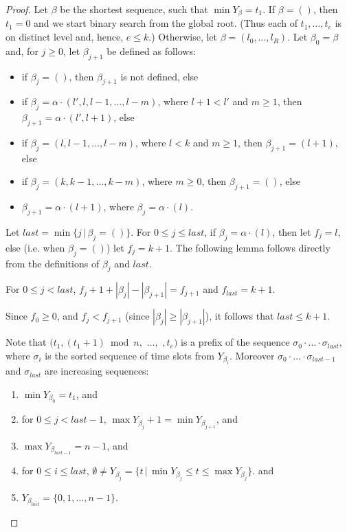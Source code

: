 \documentclass{llncs}
\begin{document}
\begin{proof}
Let $\beta$ be the shortest sequence, such that $\min Y_\beta= t_1$.
If $\beta=()$, then $t_1=0$ and we start binary search from the global root.
(Thus each of $t_1, \ldots, t_{e}$ is on distinct level and, hence, $e\le k$.)
Otherwise, let $\beta=(l_0,\ldots,l_R)$.
Let $\beta_0=\beta$ and, for $j\ge 0$, let $\beta_{j+1}$ be defined
as follows:
\begin{itemize}
\item 
  if $\beta_j=()$, then $\beta_{j+1}$ is not defined, 
  else
\item 
  if $\beta_j=\alpha\cdot (l',l, l-1,\ldots, l-m)$,
  where $l+1<l'$ and $m\ge 1$, 
  then $\beta_{j+1}=\alpha\cdot(l',l+1)$, 
  else
\item 
  if $\beta_j=(l,l-1,\ldots,l-m)$,
  where $l<k$ and  $m\ge 1$,
  then $\beta_{j+1}=(l+1)$, 
  else
\item 
  if $\beta_j=(k,k-1,\ldots,k-m)$,
  where $m\ge 0$,
  then $\beta_{j+1}=()$, 
  else
\item 
  $\beta_{j+1}=\alpha\cdot (l+1)$, 
  where $\beta_j=\alpha\cdot (l)$.

\end{itemize}
Let $last=\min\{j\,|\, \beta_j=()\}$.
For $0\le j\le last$,
if $\beta_j=\alpha\cdot(l)$, then let $f_j=l$,
else (i.e. when $\beta_j=()$) let $f_j=k+1$.
The following lemma follows directly from the definitions of $\beta_j$ and $last$.
\begin{lemma}\label{foot-increasing-lemma}
For $0\le j<last$, $f_j+1+|\beta_j|-|\beta_{j+1}|= f_{j+1}$ and $f_{last}= k+1$.
\end{lemma}
Since $f_0\ge 0$, and $f_j<f_{j+1}$ (since $|\beta_j|\ge |\beta_{j+1}|$), 
it follows that $last\le k+1$.

Note that $(t_1,(t_1+1)\bmod n,$ $\ldots,$ $, t_e)$ is a prefix of the sequence
$\sigma_0\cdot\ldots\cdot\sigma_{last}$, 
where $\sigma_i$ is the sorted sequence of time slots from $Y_{\beta_i}$.
Moreover $\sigma_0\cdot\ldots\cdot\sigma_{last-1}$ and $\sigma_{last}$ are
increasing sequences:
\begin{lemma}\label{Y-beta-decomposition}
\begin{enumerate}
\item
  $\min Y_{\beta_0}=t_1$, 
  and
\item
  for $0\le j<last-1$,
  $\max Y_{\beta_{j}}+1 = \min Y_{\beta_{j+1}}$, 
  and
\item
  $\max Y_{\beta_{last-1}}=n-1$, 
  and
\item
  for $0\le i\le last$,
  $\emptyset\not=Y_{\beta_{j}} = \{t\,|\,\min Y_{\beta_{j}}\le t\le \max Y_{\beta_{j}}\}$.
  and
\item
  $Y_{\beta_{last}}=\{0,1,\ldots,n-1\}$.
\end{enumerate}
\end{lemma}


\end{proof}
\end{document}
